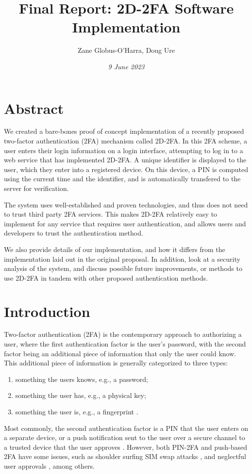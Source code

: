 \documentclass[11pt]{article}
\title{Final Report: 2D-2FA Software Implementation}
\author{Zane Globus-O'Harra, Doug Ure}
\date{\textit{9 June 2023}}
\begin{document}
\maketitle

\section*{Abstract}

We created a bare-bones proof of concept implementation of a recently
proposed two-factor authentication (2FA) mechanism called 2D-2FA. In
this 2FA scheme, a user enters their login information on a login
interface, attempting to log in to a web service that has implemented
2D-2FA. A unique identifier is displayed to the user, which they enter
into a registered device. On this device, a PIN is computed using the
current time and the identifier, and is automatically transfered to the
server for verification. 

The system uses well-established and proven technologies, and thus does
not need to trust third party 2FA services. This makes 2D-2FA relatively
easy to implement for any service that requires user authentication, and
allows users and developers to trust the authentication method. 

We also provide details of our implementation, and how it differs from
the implementation laid out in the original proposal. In addition, look
at a security analysis of the system, and discuss possible future
improvements, or methods to use 2D-2FA in tandem with other proposed
authentication methods. 


\section{Introduction}

Two-factor authentication (2FA) is the contemporary approach to
authorizing a user, where the first authentication factor is the user's
password, with the second factor being an additional piece of
information that only the user could know. This additional piece of
information is generally categorized to three types:
\begin{enumerate}
    \item something the users knows, e.g., a password;
    \item something the user has, e.g., a physical key;
    \item something the user is, e.g., a fingerprint \cite{MFAProtocols}.
\end{enumerate}
Most commonly, the second authentication factor is a PIN that the user
enters on a separate device, or a push notification sent to the user
over a secure channel to a trusted device that the user approves
\cite{MFAProtocols}. However, both PIN-2FA and push-based 2FA have some
issues, such as shoulder surfing \cite{ShoulderSurfingWild,
ShoulderSurfingExperimental} SIM swap attacks \cite{Saha2016}, and
neglectful user approvals \cite{BypassingPush}, among others.
\end{document}
